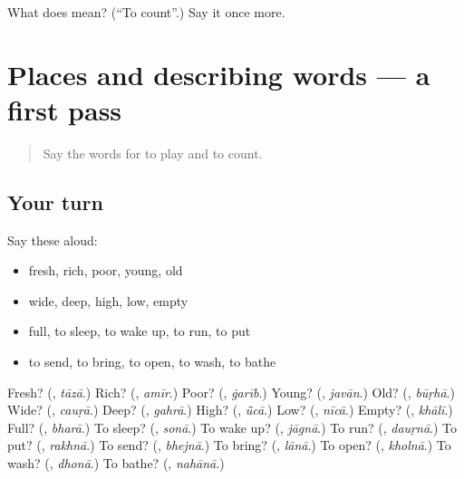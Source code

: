 \begin{tcolorbox}[breakable,colback=teal!4,colframe=teal!35!black,title={Before you move on}]
What does  mean? (\textquotedblleft{}To count\textquotedblright{}.) Say it once more.
\end{tcolorbox}
\section[(dialogue)]{Places and describing words — a first pass}

\label{lesson:HI-R165-first-pass-places-and-describing-words}



\begin{quote}
Say the words for to play and to count.
\end{quote}

\subsection*{Your turn}
Say these aloud:

\begin{itemize}
\raggedright
  \item fresh, rich, poor, young, old
  \item wide, deep, high, low, empty
  \item full, to sleep, to wake up, to run, to put
  \item to send, to bring, to open, to wash, to bathe
\end{itemize}

\begin{tcolorbox}[breakable,colback=teal!4,colframe=teal!35!black,title={Before you move on}]
Fresh? (\textbf{}, \emph{tāzā}.) Rich? (\textbf{}, \emph{amīr}.) Poor? (\textbf{}, \emph{ġarīb}.) Young? (\textbf{}, \emph{javān}.) Old? (\textbf{}, \emph{būṛhā}.) Wide? (\textbf{}, \emph{cauṛā}.) Deep? (\textbf{}, \emph{gahrā}.) High? (\textbf{}, \emph{ū̃cā}.) Low? (\textbf{}, \emph{nīcā}.) Empty? (\textbf{}, \emph{khālī}.) Full? (\textbf{}, \emph{bharā}.) To sleep? (\textbf{}, \emph{sonā}.) To wake up? (\textbf{}, \emph{jāgnā}.) To run? (\textbf{}, \emph{dauṛnā}.) To put? (\textbf{}, \emph{rakhnā}.) To send? (\textbf{}, \emph{bhejnā}.) To bring? (\textbf{}, \emph{lānā}.) To open? (\textbf{}, \emph{kholnā}.) To wash? (\textbf{}, \emph{dhonā}.) To bathe? (\textbf{}, \emph{nahānā}.)
\end{tcolorbox}
